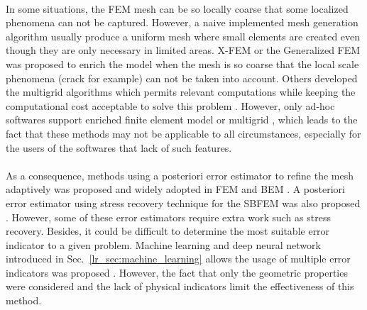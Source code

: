 \paragraph{}
In some situations, the FEM mesh can be so locally coarse that some localized phenomena can not be captured.
However, a naive implemented mesh generation algorithm usually produce a uniform mesh where small elements are created even though they are only necessary in limited areas.
X-FEM \citep{Moes1999} or the Generalized FEM \citep{STROUBOULIS20014081,doi:10.1002/nme.4954} was proposed to enrich the model when the mesh is so coarse that the local scale phenomena (crack for example) can not be taken into account.
Others developed the multigrid algorithms which permits relevant computations while keeping the computational cost acceptable to solve this problem \citep{doi:10.1002/nme.2427, doi:10.1002/nme.3037}.
However, only ad-hoc softwares support enriched finite element model or multigrid \citep{Duval2018}, which leads to the fact that these methods may not be applicable to all circumstances, especially for the users of the softwares that lack of such features.

\paragraph{}
As a consequence, methods using a posteriori error estimator to refine the mesh adaptively was proposed and widely adopted in FEM \citep{Duval2018, doi:10.1002/gamm.201490020,PRUDHOMME20091887,BAUMAN2009799, doi:10.1002/nme.1620121010, doi:10.1002/nme.1620240618,Oden1989,doi:10.1002/nme.1620240206,doi:10.1002/nme.1620330702,doi:10.1002/nme.1620330703, BOROOMAND1999127, ZIENKIEWICZ1999111, Ainsworth1993} and BEM \citep{Zhao1998, Guiggiani1990, KAMIYA1992223, KITA199421,ZHAO1999793,KITA2000317}.
A posteriori error estimator using stress recovery technique for the SBFEM was also proposed \citep{NME:NME439}.
However, some of these error estimators require extra work such as stress recovery.
Besides, it could be difficult to determine the most suitable error indicator to a given problem.
Machine learning and deep neural network introduced in Sec.~\ref{lr_sec:machine_learning} allows the usage of multiple error indicators was proposed \citep{SaeedIqbal;Graham.F.Carey2005}.
However, the fact that only the geometric properties were considered and the lack of physical indicators limit the effectiveness of this method.
